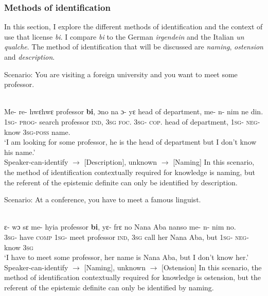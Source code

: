 \documentclass[output=paper,modfonts,nonflat,draftmode]{langsci/langscibook}
\begin{document}
\subsubsection{Methods of identification}
In this section, I explore the different methods of identification and the context of use that license \emph{bi}. I compare \emph{bi} to the German \emph{irgendein} and the Italian \emph{un qualche}. The method of identification that will be discussed are \emph{naming}, \emph{ostension} and \emph{description}.\pagebreak

Scenario: You are visiting a foreign university and you want to meet some professor.

\ea\label{owusu:ex45a}\\
\gll Me- re- hwεhwε professor \textbf{bi}, ɔno na ɔ- yε head of department, me- n- nim ne din.\\
\textsc{1sg}- \textsc{prog}- search professor \textsc{ind}, \textsc{3sg} \textsc{foc}. \textsc{3sg}- \textsc{cop}. head of department, \textsc{1sg}- \textsc{neg}- know \textsc{3sg}-\textsc{poss} name.\\
\glt `I am looking for some professor, he is the head of department but I don't know his name.'\\
	Speaker-can-identify $\rightarrow$ [Description], unknown $\rightarrow$  [Naming]
 \z  In this scenario, the method of identification contextually required for knowledge is naming, but the referent of the epistemic definite can only be identified by description.
 
Scenario: At a conference, you have to meet a famous linguist.

\ea\label{owusu:ex45b}\\
\gll ε- wɔ  sε me- hyia professor \textbf{bi}, yε- frε no Nana Aba nanso me- n- nim no.\\
\textsc{3sg}- have \textsc{comp} \textsc{1sg}- meet professor \textsc{ind}, \textsc{3sg} call her Nana Aba, but \textsc{1sg}- \textsc{neg}- know \textsc{3sg}\\
\glt `I have to meet some professor, her name is Nana Aba, but I don't know her.'\\
	Speaker-can-identify $\rightarrow$ [Naming], unknown $\rightarrow$  [Ostension]
 \z In this scenario, the method of identification contextually required for knowledge is ostension, but the referent of the epistemic definite can only be identified by naming.
\end{document}
